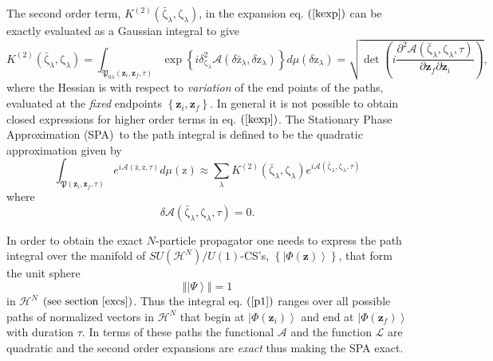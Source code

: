 \documentclass[aps,preprint]{revtex4}%
\begin{document}
The second order term, $K^{\left(  2\right)  }\left(  \mathrm{\bar{\zeta}%
}_{\lambda}\mathbf{,}\mathrm{\zeta}_{\lambda}\right)  $, in the expansion eq.
$\left(  \ref{kexp}\right)  $ can be exactly evaluated as a Gaussian integral
to give \cite{Schulmann}
\begin{equation}
K^{\left(  2\right)  }\left(  \mathrm{\bar{\zeta}}_{\lambda}\mathbf{,}%
\mathrm{\zeta}_{\lambda}\right)  =\int_{\mathfrak{P}_{0\lambda}\left(
\mathbf{z}_{i},\mathbf{z}_{f},\tau\right)  }\exp\left\{  i\delta
_{\mathrm{\zeta}_{\lambda}}^{2}\mathcal{A}\left(  \delta\mathrm{\bar{z}%
}_{\lambda},\delta\mathrm{z}_{\lambda}\right)  \right\}  d\mu\left(
\delta\mathrm{z}_{\lambda}\right)  =\sqrt{\det\left(  i\frac{\partial
^{2}\mathcal{A}\left(  \mathrm{\bar{\zeta}}_{\lambda}\mathbf{,}\mathrm{\zeta
}_{\lambda}\mathbf{,}\tau\right)  }{\partial\mathbf{z}_{f}\partial
\mathbf{z}_{i}}\right)  },
\end{equation}
where the Hessian is with respect to \emph{variation} of the end points of the
paths, evaluated at the \emph{fixed} endpoints $\left\{  \mathbf{z}%
_{i},\mathbf{z}_{f}\right\}  $. In general it is not possible to obtain closed
expressions for higher order terms in eq. $\left(  \ref{kexp}\right)  $. The
Stationary Phase Approximation (SPA)\ to the path integral is defined to be
the quadratic approximation given by
\begin{equation}
\int_{\mathfrak{P}\left(  \mathbf{z}_{i},\mathbf{z}_{f},\tau\right)
}e^{i\mathcal{A}\left(  \mathrm{\bar{z}},\mathrm{z}\mathbf{,}\tau\right)
}d\mu\left(  \mathrm{z}\right)  \approx\sum_{\lambda}K^{\left(  2\right)
}\left(  \mathrm{\bar{\zeta}}_{\lambda}\mathbf{,}\mathrm{\zeta}_{\lambda
}\right)  e^{i\mathcal{A}\left(  \mathrm{\bar{\zeta}}_{\lambda}\mathbf{,}%
\mathrm{\zeta}_{\lambda}\mathbf{,}\tau\right)  }%
\end{equation}
where
\begin{equation}
\delta\mathcal{A}\left(  \mathrm{\bar{\zeta}}_{\lambda}\mathbf{,}%
\mathrm{\zeta}_{\lambda}\mathbf{,}\tau\right)  =0.
\end{equation}


In order to obtain the exact $N$-particle propagator one needs to express the
path integral over the manifold of $SU\left(  \mathcal{H}^{N}\right)
/U\left(  1\right)  $-CS's, $\left\{  \left\vert \Phi\left(  \mathbf{z}%
\right)  \right\rangle \right\}  $, that form the unit sphere
\begin{equation}
\left\Vert \left\vert \Psi\right\rangle \right\Vert =1
\end{equation}
in $\mathcal{H}^{N}$ $\left(  \text{see section }\ref{excs}\right)  $. Thus
the integral eq. $\left(  \ref{p1}\right)  $ ranges over all possible paths of
normalized vectors in $\mathcal{H}^{N}$ that begin at $\left\vert \Phi\left(
\mathbf{z}_{i}\right)  \right\rangle $ and end at $\left\vert \Phi\left(
\mathbf{z}_{f}\right)  \right\rangle $ with duration $\tau$. In terms of these
paths the functional $\mathcal{A}$ and the function $\mathcal{L}$ are
quadratic and the second order expansions are \emph{exact }thus making the SPA exact.
\end{document}
